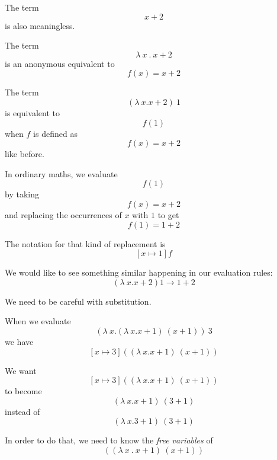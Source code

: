 \begin{frame}
  The term
  \[x + 2\]
  is also meaningless.
\end{frame}

\begin{frame}
  The term
  \[\lambda~x~.~x + 2\]
  is an anonymous equivalent to
  \[f(x) = x + 2\]
\end{frame}

\begin{frame}
  The term
  \[(\lambda~x . x + 2)~1 \]
  is equivalent to
  \[f(1)\]
  when $f$ is defined as
  \[f(x) = x + 2\]
  like before.
\end{frame}

\begin{frame}
  In ordinary maths, we evaluate
  \[f(1)\]
  by taking
  \[f(x) = x + 2\]
  and replacing the occurrences of $x$ with $1$ to get
  \[f(1) = 1 + 2\]
\end{frame}

\begin{frame}
  The notation for that kind of replacement is
  \[\left[ x \mapsto 1 \right] f \]
\end{frame}

\begin{frame}
  We would like to see something similar happening in our evaluation rules:
  \[(\lambda~x . x + 2) 1 \longrightarrow 1 + 2\]
\end{frame}

\begin{frame}
  We need to be careful with substitution.
\end{frame}

\begin{frame}
  When we evaluate
  \[\left(\lambda~x . \left( \lambda~x . x + 1 \right)~\left(x + 1\right)\right)~3 \]
  we have
  \[\left[ x \mapsto 3 \right]
      \left( \left( \lambda~x . x + 1 \right)~\left(x + 1\right) \right)
  \] 
\end{frame}

\begin{frame}
  We want
  \[\left[ x \mapsto 3 \right]
      \left( \left( \lambda~x . x + 1 \right)~\left(x + 1\right) \right)
  \] 
  to become
  \[\left( \lambda~x . x + 1 \right)~(3 + 1)\]
  instead of
  \[\left( \lambda~x . 3 + 1 \right)~(3 + 1)\]
\end{frame}

\begin{frame}
  In order to do that, we need to know the {\it free variables} of
  \[
      \left( \left( \lambda~x~.~x + 1 \right)~\left(x + 1\right) \right)
  \] 
\end{frame}


